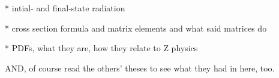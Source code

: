    * intial- and final-state radiation



   * cross section formula and matrix elements and what said matrices do

   * PDFs, what they are, how they relate to Z physics

AND, of course read the others' theses to see what they had in here, too.  



